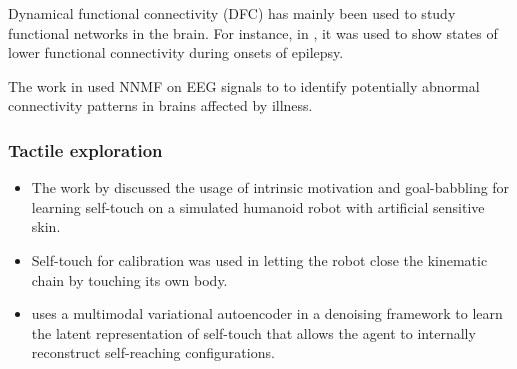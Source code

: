 Dynamical functional connectivity (DFC) has mainly been used to study functional networks in the brain. For instance, in \cite{Christiaen2020Dynamicfunctionalconnectivity}, it was used to show states of lower functional connectivity during onsets of epilepsy.

The work in \cite{Zhou2020Earlychildhooddevelopmental} used NNMF on EEG signals to to identify potentially abnormal connectivity patterns in brains affected by illness.

\subsubsection{Tactile exploration}

\begin{itemize}
	\item The work by \cite{Gama2021Goaldirectedtactile} discussed the usage of intrinsic motivation and goal-babbling for learning self-touch on a simulated humanoid robot with artificial sensitive skin.
	\item Self-touch for calibration was used in \cite{Roncone2014Automatickinematicchain} letting the robot close the kinematic chain by touching its own body.
	\item \cite{Marcel2022Learningreachown} uses a multimodal variational autoencoder in a denoising framework to learn the latent representation of self-touch that allows the agent to internally reconstruct self-reaching configurations. 
\end{itemize}


